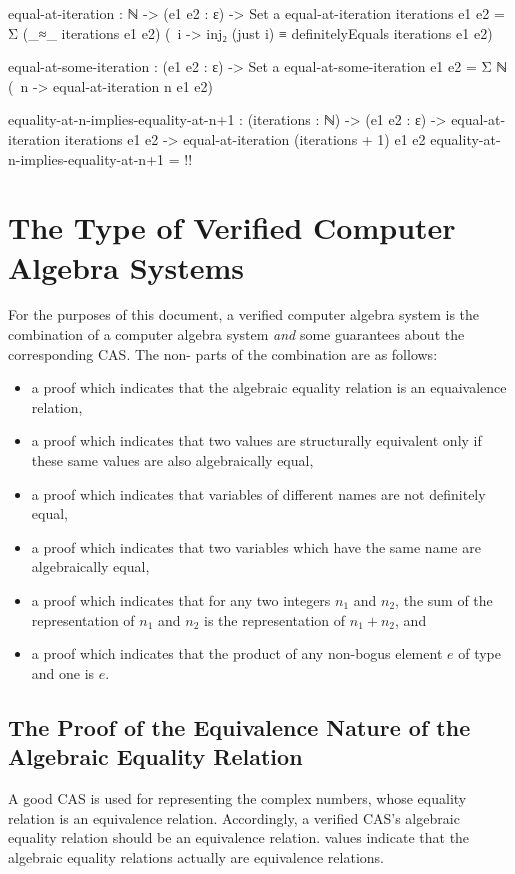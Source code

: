 \documentclass{report}
\begin{document}
\begin{code}
  equal-at-iteration : ℕ -> (e1 e2 : ε) -> Set a
  equal-at-iteration iterations e1 e2 =
    Σ (_≈_ iterations e1 e2)
      (\ i -> inj₂ (just i) ≡ definitelyEquals iterations e1 e2)

  equal-at-some-iteration : (e1 e2 : ε) -> Set a
  equal-at-some-iteration e1 e2 = Σ ℕ (\ n -> equal-at-iteration n e1 e2)

  equality-at-n-implies-equality-at-n+1 :
    (iterations : ℕ) ->
    (e1 e2 : ε) ->
    equal-at-iteration iterations e1 e2 ->
    equal-at-iteration (iterations + 1) e1 e2
  equality-at-n-implies-equality-at-n+1 = {!!}
\end{code}

\section{The Type of Verified Computer Algebra Systems}
For the purposes of this document, a verified computer algebra system is the combination of a  computer algebra system \emph{and} some guarantees about the corresponding CAS.  The non- parts of the combination are as follows:

\begin{itemize}
 \item a proof which indicates that the algebraic equality relation is an equaivalence relation,
 \item a proof which indicates that two values are structurally equivalent only if these same values are also algebraically equal,
 \item a proof which indicates that variables of different names are not definitely equal,
 \item a proof which indicates that two variables which have the same name are algebraically equal,
 \item a proof which indicates that for any two integers \(n_1\) and \(n_2\), the sum of the representation of \(n_1\) and \(n_2\) is the representation of \(n_1 + n_2\), and
 \item a proof which indicates that the product of any non-bogus element \(e\) of type  and one is \(e\).
\end{itemize}

\subsection{The Proof of the Equivalence Nature of the Algebraic Equality Relation}
A good CAS is used for representing the complex numbers, whose equality relation is an equivalence relation.  Accordingly, a verified CAS's algebraic equality relation should be an equivalence relation.   values indicate that the algebraic equality relations actually are equivalence relations.
\end{document}
